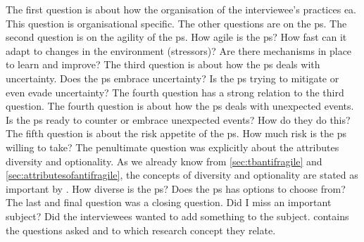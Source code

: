 The first question is about how the organisation of the interviewee's practices \acrshort{ea}. This question is organisational specific. The other questions are on the \gls{ps}. The second question is on the agility of the \gls{ps}. How agile is the \gls{ps}? How fast can it adapt to changes in the environment (\glspl{stressor})? Are there mechanisms in place to learn and improve? The third question is about how the \gls{ps} deals with \gls{uncertainty}. Does the \gls{ps} embrace uncertainty? Is the \gls{ps} trying to mitigate or even evade \gls{uncertainty}? The fourth question has a strong relation to the third question. The fourth question is about how the \gls{ps} deals with unexpected events. Is the \gls{ps} ready to counter or embrace unexpected events? How do they do this? The fifth question is about the risk appetite of the \gls{ps}. How much risk is the \gls{ps} willing to take? The penultimate question was explicitly about the \glspl{attribute} \gls{diversity} and \gls{optionality}. As we already know from  \cref{sec:tbantifragile} and \cref{sec:attributesofantifragile}, the concepts of \gls{diversity} and \gls{optionality} are stated as important by \textcites{Taleb2012}{Gorgeon2015}{Botjes2021}. How diverse is the \gls{ps}? Does the \gls{ps} has options to choose from? The last and final question was a closing question. Did I miss an important subject? Did the interviewees wanted to add something to the subject.  contains the questions asked and to which research concept they relate.

